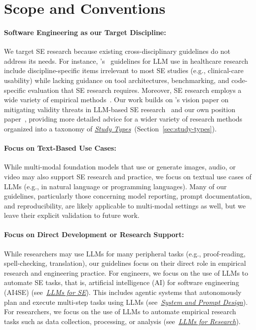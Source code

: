 \documentclass[smallextended]{svjour3}
\newif\ifpaper\papertrue
\newcommand{\studytypes}{\hyperref[sec:study-types]{\emph{Study Types}}\xspace}
\newcommand{\llmsforresearcher}{\hyperref[sec:llms-as-tools-for-software-engineering-researchers]{\emph{LLMs for Research}}\xspace}
\newcommand{\llmsforengineers}{\hyperref[sec:llms-as-tools-for-software-engineers]{\emph{LLMs for SE}}\xspace}
\newcommand{\studytypes}{\href{/study-types}{\emph{Study Types}}\xspace}
\newcommand{\llmsforresearcher}{\href{/study-types/\#introduction-llms-as-tools-for-software-engineering-researchers}{\emph{LLMs for Research}}\xspace}
\newcommand{\llmsforengineers}{\href{/study-types/\#introduction-llms-as-tools-for-software-engineers}{\emph{LLMs for SE}}\xspace}
\newcommand{\design}{\hyperref[sec:report-system-and-prompt-design]{\emph{System and Prompt Design}}\xspace}
\newcommand{\design}{\href{/guidelines\#report-system-and-prompt-design}{\emph{System and Prompt Design}}\xspace}
\newcommand{\scopeparagraph}[1]{\paragraph{\bfseries #1:}}
\newcommand{\scopeparagraph}[1]{\subsubsection{#1}}
\begin{document}
\section{Scope and Conventions}
\label{sec:scope}

\scopeparagraph{Software Engineering as our Target Discipline}

We target SE research because existing cross-disciplinary guidelines do not address its needs. For instance, \citeauthor{Gallifant2025}'s~\cite{Gallifant2025} guidelines for LLM use in healthcare research include discipline-specific items irrelevant to most SE studies (e.g., clinical-care usability) while lacking guidance on tool architectures, benchmarking, and code-specific evaluation that SE research requires.
Moreover, SE research employs a wide variety of empirical methods~\cite{ralph2021empiricalstandardssoftwareengineering, DBLP:books/sp/WohlinRHORW24}. Our work builds on \citeauthor{DBLP:conf/icse/SallouDP24}'s vision paper on mitigating validity threats in LLM-based SE research~\cite{DBLP:conf/icse/SallouDP24} and our own position paper~\cite{DBLP:conf/wsese/0001BFB25}, providing more detailed advice for a wider variety of research methods organized into a taxonomy of \studytypes\ifpaper~(Section~\ref{sec:study-types})\fi.

\scopeparagraph{Focus on Text-Based Use Cases}

While multi-modal foundation models that use or generate images, audio, or video may also support SE research and practice, we focus on textual use cases of LLMs (e.g., in natural language or programming languages). Many of our guidelines, particularly those concerning model reporting, prompt documentation, and reproducibility, are likely applicable to multi-modal settings as well, but we leave their explicit validation to future work.

\scopeparagraph{Focus on Direct Development or Research Support}

While researchers may use LLMs for many peripheral tasks (e.g., proof-reading, spell-checking, translation), our guidelines focus on their direct role in empirical research and engineering practice.
For engineers, we focus on the use of LLMs to automate SE tasks, that is, artificial intelligence (AI) for software engineering (AI4SE) (see~\llmsforengineers).
This includes agentic systems that autonomously plan and execute multi-step tasks using LLMs (see~\design).
For researchers, we focus on the use of LLMs to automate empirical research tasks such as data collection, processing, or analysis (see~\llmsforresearcher).
\end{document}
